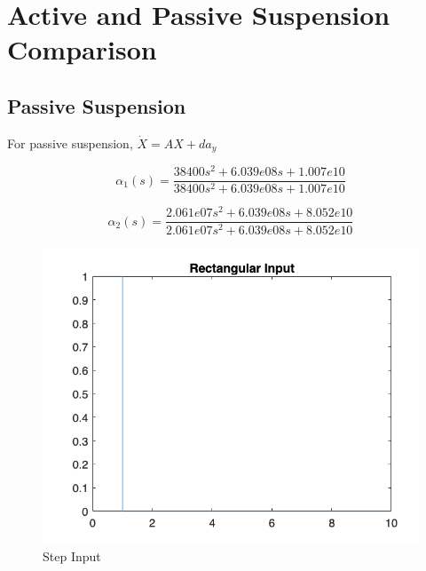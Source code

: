\documentclass[12pt, a4paper, oneside]{report}
\begin{document}
\section{Active and Passive Suspension Comparison}

\subsection{Passive Suspension}

For passive suspension, $ \dot X = A X + d a_y $

\begin{equation}
    \alpha_1 (s) = \frac{38400 s^2 + 6.039e08 s + 1.007e10}{38400 s^2 + 6.039e08 s + 1.007e10}
    \label{eq:Q4_passive_alpha1}
\end{equation}

\begin{equation}
    \alpha_2 (s) = \frac{2.061e07 s^2 + 6.039e08 s + 8.052e10}{2.061e07 s^2 + 6.039e08 s + 8.052e10}
\end{equation}

\begin{figure}[h]
    \centering
    \includegraphics[width=0.5\linewidth]{images/Q4_step_input.png}
    \caption{Step Input}
    \label{fig:Q4_step_input}
\end{figure}
\end{document}
